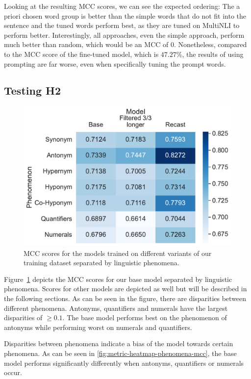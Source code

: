 Looking at the resulting \ac{MCC} scores, we can see the expected ordering: The a priori chosen word group is better than the simple words that do not fit into the sentence and the tuned words perform best, as they are tuned on \ac{MultiNLI} to perform better. Interestingly, all approaches, even the simple approach, perform much better than random, which would be an \ac{MCC} of $0$. Nonetheless, compared to the \ac{MCC} score of the fine-tuned model, which is $47.27\%$, the results of using prompting are far worse, even when specifically tuning the prompt words.

\subsection{Testing H2}
\begin{figure}[ht]
    \centering
    \includegraphics[width=0.9\columnwidth]{./images/metric_heatmaps_phenomena/all_words/base_filtered_recast_matthews_correlation.pdf}
    \caption{\ac{MCC} scores for the models trained on different variants of our training dataset separated by linguistic phenomena.}
    \label{fig:metric-heatmap-phenomena-mcc}
\end{figure}

Figure~\ref{fig:metric-heatmap-phenomena-mcc} depicts the \acs{MCC} scores for our base model separated by linguistic phenomena. Scores for other models are depicted as well but will be described in the following sections. As can be seen in the figure, there are disparities between different phenomena. Antonyms, quantifiers and numerals have the largest disparities of $\geq 0.1$. The base model performs best on the phenomenon of antonyms while performing worst on numerals and quantifiers.

Disparities between phenomena indicate a bias of the model towards certain phenomena. As can be seen in \autoref{fig:metric-heatmap-phenomena-mcc}, the base model performs significantly differently when antonyms, quantifiers or numerals occur.

